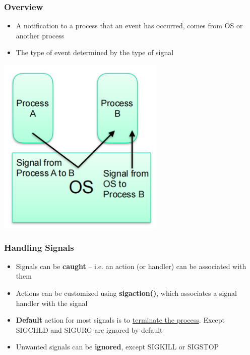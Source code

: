 \documentclass[12pt]{article}
\begin{document}
\subsubsection{Overview}
\begin{itemize}
    \item A notification to a process that an event has occurred, comes from OS or another process
    \item The type of event determined by the type of signal
\end{itemize}
\includegraphics[width=0.6\textwidth]{SignalOverview.png}
\subsubsection{Handling Signals}
\begin{itemize}
    \item Signals can be {\bfseries caught} – i.e. an action (or handler) can be associated with them
    \item Actions can be customized using {\bfseries sigaction()}, which associates a signal handler with the signal
    \item {\bfseries Default} action for most signals is to \underline{terminate the process}. Except SIGCHLD and SIGURG are ignored by default
    \item Unwanted signals can be {\bfseries ignored}, except SIGKILL or SIGSTOP
\end{itemize}
\end{document}
